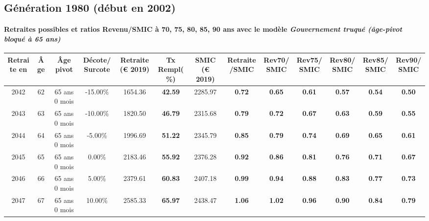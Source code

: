 \newpage 
 
\subsection{Génération 1980 (début en 2002)} 

\paragraph{Retraites possibles et ratios Revenu/SMIC à 70, 75, 80, 85, 90 ans avec le modèle \emph{Gouvernement truqué (âge-pivot bloqué à 65 ans)}}  
 
{ \scriptsize \begin{center} 
\begin{tabular}[htb]{|c|c||c|c||c|c||c||c|c|c|c|c|c|} 
\hline 
 Retraite en &  Âge &  Âge pivot &  Décote/Surcote &  Retraite (\euro{} 2019) &  Tx Rempl(\%) &  SMIC (\euro{} 2019) &  Retraite/SMIC &  Rev70/SMIC &  Rev75/SMIC &  Rev80/SMIC &  Rev85/SMIC &  Rev90/SMIC \\ 
\hline \hline 
 2042 &  62 &  65 ans 0 mois &  -15.00\% &  1654.36 &  {\bf 42.59} &  2285.97 &  {\bf {\color{red} 0.72}} &  {\bf {\color{red} 0.65}} &  {\bf {\color{red} 0.61}} &  {\bf {\color{red} 0.57}} &  {\bf {\color{red} 0.54}} &  {\bf {\color{red} 0.50}} \\ 
\hline 
 2043 &  63 &  65 ans 0 mois &  -10.00\% &  1820.50 &  {\bf 46.79} &  2315.68 &  {\bf {\color{red} 0.79}} &  {\bf {\color{red} 0.72}} &  {\bf {\color{red} 0.67}} &  {\bf {\color{red} 0.63}} &  {\bf {\color{red} 0.59}} &  {\bf {\color{red} 0.55}} \\ 
\hline 
 2044 &  64 &  65 ans 0 mois &  -5.00\% &  1996.69 &  {\bf 51.22} &  2345.79 &  {\bf {\color{red} 0.85}} &  {\bf {\color{red} 0.79}} &  {\bf {\color{red} 0.74}} &  {\bf {\color{red} 0.69}} &  {\bf {\color{red} 0.65}} &  {\bf {\color{red} 0.61}} \\ 
\hline 
 2045 &  65 &  65 ans 0 mois &  0.00\% &  2183.46 &  {\bf 55.92} &  2376.28 &  {\bf {\color{red} 0.92}} &  {\bf {\color{red} 0.86}} &  {\bf {\color{red} 0.81}} &  {\bf {\color{red} 0.76}} &  {\bf {\color{red} 0.71}} &  {\bf {\color{red} 0.67}} \\ 
\hline 
 2046 &  66 &  65 ans 0 mois &  5.00\% &  2379.61 &  {\bf 60.83} &  2407.18 &  {\bf {\color{red} 0.99}} &  {\bf {\color{red} 0.94}} &  {\bf {\color{red} 0.88}} &  {\bf {\color{red} 0.83}} &  {\bf {\color{red} 0.77}} &  {\bf {\color{red} 0.73}} \\ 
\hline 
 2047 &  67 &  65 ans 0 mois &  10.00\% &  2585.33 &  {\bf 65.97} &  2438.47 &  {\bf 1.06} &  {\bf 1.02} &  {\bf {\color{red} 0.96}} &  {\bf {\color{red} 0.90}} &  {\bf {\color{red} 0.84}} &  {\bf {\color{red} 0.79}} \\ 
\hline 
\hline 
\end{tabular} 
\end{center} } 
